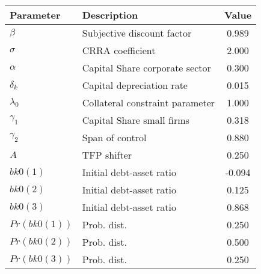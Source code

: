  \begin{tabular}{llc} \hline 
 Parameter & Description & Value \\ 
 \hline 
$\beta$  & Subjective discount factor &    0.989 \\ 
$\sigma$  & CRRA coefficient &    2.000 \\ 
$\alpha$  & Capital Share corporate sector &    0.300 \\ 
$\delta_k$  & Capital depreciation rate &    0.015 \\ 
$\lambda_0$  & Collateral constraint parameter &    1.000 \\ 
$\gamma_1$  & Capital Share small firms &    0.318 \\ 
$\gamma_2$  & Span of control &    0.880 \\ 
$A$  & TFP shifter &    0.250 \\ 
$bk0(1)$  & Initial debt-asset ratio &   -0.094 \\ 
$bk0(2)$  & Initial debt-asset ratio &    0.125 \\ 
$bk0(3)$  & Initial debt-asset ratio &    0.868 \\ 
$Pr(bk0(1))$  & Prob. dist. &    0.250 \\ 
$Pr(bk0(2))$  & Prob. dist. &    0.500 \\ 
$Pr(bk0(3))$  & Prob. dist. &    0.250 \\ 
\hline 
 \end{tabular} 
